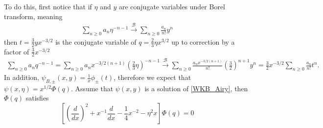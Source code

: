 \documentclass{article}
\newcommand{\borel}{\mathcal{B}}
\theoremstyle{definition}
\theoremstyle{plain}
\begin{document}
To do this, first notice that if $\eta$ and $y$ are conjugate variables under Borel transform, meaning 
\begin{align*}
\sum_{n\geq 0}a_n\eta^{-n-1}  \overset{\borel}{\longrightarrow} \sum_{n\geq 0}\frac{a_n}{n!} y^{n} 
\end{align*} 
then $t=\frac{3}{2}yx^{-3/2}$ is the conjugate variable of $q=\frac{2}{3}\eta x^{3/2}$ up to correction by a factor of $\frac{3}{2}x^{-3/2}$
\begin{align*}
\sum_{n\geq 0}a_nq^{-n-1}=\sum_{n\geq 0}a_nx^{-3/2(n+1)}\left(\frac{2}{3}\eta\right)^{-n-1}  \overset{\borel}{\longrightarrow} \sum_{n\geq 0}\frac{a_nx^{-3/2(n+1)}}{n!}\left(\frac{3}{2}\right)^{n+1}  y^{n}=\frac{3}{2}x^{-3/2}\sum_{n\geq 0}\frac{a_n}{n!} t^{n}. 
\end{align*}
In addition, $\psi_{B,\pm}(x,y)=\frac{1}{x}\phi_{\pm}(t)$, therefore we expect that $\psi(x,\eta)=x^{1/2}\Phi(q)$. Assume that $\psi(x,y)$ is a solution of \eqref{WKB_Airy}, then $\Phi(q)$ satisfies
\begin{equation}
\label{eq_Phi}
\left[\left(\frac{d}{dx}\right)^2+x^{-1}\frac{d}{dx}-\frac{1}{4}x^{-2} - \eta^2 x \right] \Phi(q) = 0
\end{equation}
\end{document}
